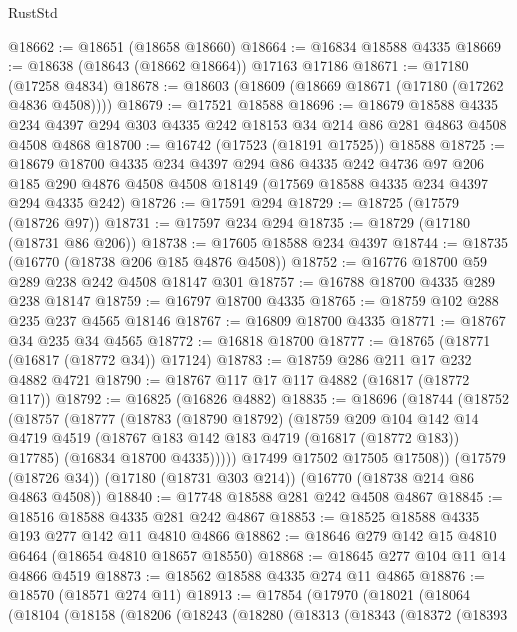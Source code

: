 \begin{lexlean}{RustStd}
\begin{coremodule}
@18662 := @18651 (@18658 @18660)
@18664 := @16834 @18588 @4335
@18669 := @18638 (@18643 (@18662 @18664)) @17163 @17186
@18671 := @17180 (@17258 @4834)
@18678 := @18603 (@18609 (@18669 @18671 (@17180 (@17262 @4836 @4508))))
@18679 := @17521 @18588
@18696 := @18679
    @18588
    @4335
    @234
    @4397
    @294
    @303
    @4335
    @242
    @18153
    @34
    @214
    @86
    @281
    @4863
    @4508
    @4508
    @4868
@18700 := @16742 (@17523 (@18191 @17525)) @18588
@18725 := @18679
    @18700
    @4335
    @234
    @4397
    @294
    @86
    @4335
    @242
    @4736
    @97
    @206
    @185
    @290
    @4876
    @4508
    @4508
    @18149
    (@17569 @18588 @4335 @234 @4397 @294 @4335 @242)
@18726 := @17591 @294
@18729 := @18725 (@17579 (@18726 @97))
@18731 := @17597 @234 @294
@18735 := @18729 (@17180 (@18731 @86 @206))
@18738 := @17605 @18588 @234 @4397
@18744 := @18735 (@16770 (@18738 @206 @185 @4876 @4508))
@18752 := @16776 @18700 @59 @289 @238 @242 @4508 @18147 @301
@18757 := @16788 @18700 @4335 @289 @238 @18147
@18759 := @16797 @18700 @4335
@18765 := @18759 @102 @288 @235 @237 @4565 @18146
@18767 := @16809 @18700 @4335
@18771 := @18767 @34 @235 @34 @4565
@18772 := @16818 @18700
@18777 := @18765 (@18771 (@16817 (@18772 @34)) @17124)
@18783 := @18759 @286 @211 @17 @232 @4882 @4721
@18790 := @18767 @117 @17 @117 @4882 (@16817 (@18772 @117))
@18792 := @16825 (@16826 @4882)
@18835 := @18696
    (@18744
      (@18752
        (@18757
          (@18777
            (@18783
              (@18790 @18792)
              (@18759
                @209
                @104
                @142
                @14
                @4719
                @4519
                (@18767 @183 @142 @183 @4719 (@16817 (@18772 @183)) @17785)
                (@16834 @18700 @4335)))))
        @17499
        @17502
        @17505
        @17508))
    (@17579 (@18726 @34))
    (@17180 (@18731 @303 @214))
    (@16770 (@18738 @214 @86 @4863 @4508))
@18840 := @17748 @18588 @281 @242 @4508 @4867
@18845 := @18516 @18588 @4335 @281 @242 @4867
@18853 := @18525 @18588 @4335 @193 @277 @142 @11 @4810 @4866
@18862 := @18646 @279 @142 @15 @4810 @6464 (@18654 @4810 @18657 @18550)
@18868 := @18645 @277 @104 @11 @14 @4866 @4519
@18873 := @18562 @18588 @4335 @274 @11 @4865
@18876 := @18570 (@18571 @274 @11)
@18913 := @17854
    (@17970
      (@18021
        (@18064
          (@18104
            (@18158
              (@18206
                (@18243
                  (@18280
                    (@18313
                      (@18343
                        (@18372
                          (@18393

\end{coremodule}
\end{lexlean}
